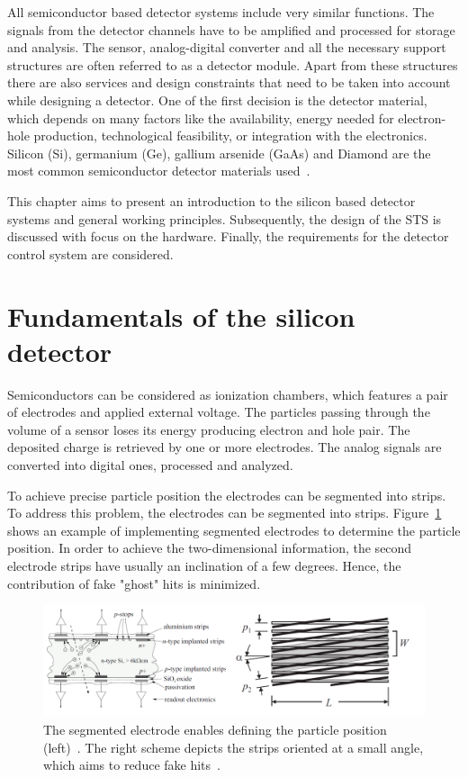 
All semiconductor based detector systems include very similar functions. The signals from the detector channels have to be amplified and processed for storage and analysis. The sensor, analog-digital converter and all the necessary support structures are often referred to as a detector module. Apart from these structures there are also services and design constraints that need to be taken into account while designing a detector. One of the first decision is the detector material, which depends on many factors like the availability, energy needed for electron-hole production, technological feasibility, or integration with the electronics. Silicon (Si), germanium (Ge), gallium arsenide (GaAs) and Diamond are the most common semiconductor detector materials used~\cite{Lutz:1999wg,Hartmann:2017gzy}.


This chapter aims to present an introduction to the silicon based detector systems and general working principles. Subsequently, the design of the \gls{STS} is discussed with focus on the hardware. Finally, the requirements for the detector control system are considered. 

\section{Fundamentals of the silicon detector}
Semiconductors can be considered as ionization chambers, which features a pair of electrodes and applied external voltage. The particles passing through the volume of a sensor loses its energy producing electron and hole pair. The deposited charge is retrieved by one or more electrodes. The analog signals are converted into digital ones, processed and analyzed.

To achieve precise particle position the electrodes can be segmented into strips. To address this problem, the electrodes can be segmented into strips. Figure~\ref{fig_si} shows an example of implementing segmented electrodes to determine the particle position. In order to achieve the two-dimensional information, the second electrode strips have usually an inclination of a few degrees. Hence, the contribution of fake "ghost" hits is minimized.  

\begin{figure}[!h]
\centering
\includegraphics[width=0.95\columnwidth]{Chapter2/images/silicons.png}
\caption{The segmented electrode enables defining the particle position (left)~\cite{Sokolov:2006vdx}. The right scheme depicts the strips oriented at a small angle, which aims to reduce fake hits~\cite{Spieler}.}
\label{fig_si}
\end{figure}
\newpage

